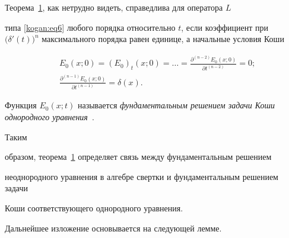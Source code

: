 \begin{remark}[1] Теорема~\hyperlink{kogan:th1}{1}, как нетрудно видеть, справедлива для оператора $L$ 

типа \eqref{kogan:eq6} любого порядка относительно $t$, если коэффициент при $\big(\delta 

'(t)\big)^n$ максимального порядка равен единице, а начальные условия Коши 

\begin{equation}

\label{kogan:eq10}

\begin{aligned}

&E_0 (x;0)=(E_0)_t (x;0)=\ldots=\frac{\partial^{(n-2)}E_0 (x;0)}{ \partial t^{(n-2)}}=0;\\

& \frac{\partial^{(n-1)}E_0 (x;0) }{ \partial t^{(n-1)} }=\delta (x).

\end{aligned}

\end{equation}

Функция $E_0 (x;t)$ называется {\it фундаментальным решением задачи Коши однородного уравнения}~\cite{kogan:bib18}. 

Таким 

образом, теорема~\hyperlink{kogan:th1}{1} определяет связь между фундаментальным решением 

неоднородного уравнения в алгебре свертки и фундаментальным решением задачи 

Коши соответствующего однородного уравнения. 

\end{remark}



\smallskip



Дальнейшее изложение  основывается на следующей лемме.



\smallskip



